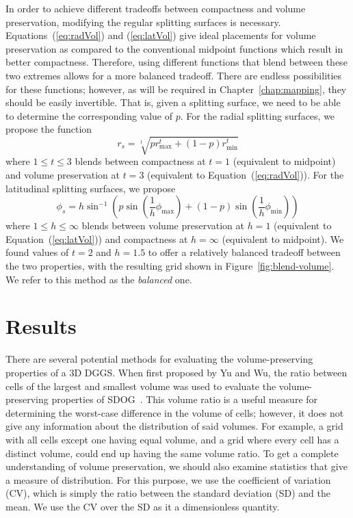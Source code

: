 In order to achieve different tradeoffs between compactness and volume preservation, modifying the regular splitting surfaces is necessary.
Equations~(\ref{eq:radVol}) and (\ref{eq:latVol}) give ideal placements for volume preservation as compared to the conventional midpoint functions which result in better compactness.
Therefore, using different functions that blend between these two extremes allows for a more balanced tradeoff.
There are endless possibilities for these functions; however, as will be required in Chapter~\ref{chap:mapping}, they should be easily invertible.
That is, given a splitting surface, we need to be able to determine the corresponding value of $p$.
For the radial splitting surfaces, we propose the function
%
\begin{equation*}
r_{s} = \sqrt[t]{ p r_\mathrm{max}^{t} + \left( 1 - p \right) r_\mathrm{min}^{t} }
\end{equation*}
%
where $1 \leq t \leq 3$ blends between compactness at $t = 1$ (equivalent to midpoint) and volume preservation at $t=3$ (equivalent to Equation~(\ref{eq:radVol})).
For the latitudinal splitting surfaces, we propose
%
\begin{equation*}
\phi_{s} = h \sin^{-1} \left( p \sin \left( \frac{1}{h} \phi_\mathrm{max} \right) + \left( 1 - p \right) \sin \left( \frac{1}{h} \phi_\mathrm{min} \right) \right)
\end{equation*}
%
where $1 \leq h \leq \infty$ blends between volume preservation at $h = 1$ (equivalent to Equation~(\ref{eq:latVol})) and compactness at $h = \infty$ (equivalent to midpoint). We found values of $t = 2$ and $h = 1.5$ to offer a relatively balanced tradeoff between the two properties, with the resulting grid shown in Figure~\ref{fig:blend-volume}.
We refer to this method as the \textit{balanced} one.


\section{Results} \label{chap:4:results}
There are several potential methods for evaluating the volume-preserving properties of a 3D DGGS.
When first proposed by Yu and Wu, the ratio between cells of the largest and smallest volume was used to evaluate the volume-preserving properties of SDOG~\cite{yu2009sdog}.
This volume ratio is a useful measure for determining the worst-case difference in the volume of cells; however, it does not give any information about the distribution of said volumes.
For example, a grid with all cells except one having equal volume, and a grid where every cell has a distinct volume, could end up having the same volume ratio.
To get a complete understanding of volume preservation, we should also examine statistics that give a measure of distribution.
For this purpose, we use the coefficient of variation (CV), which is simply the ratio between the standard deviation (SD) and the mean.
We use the CV over the SD as it a dimensionless quantity.



